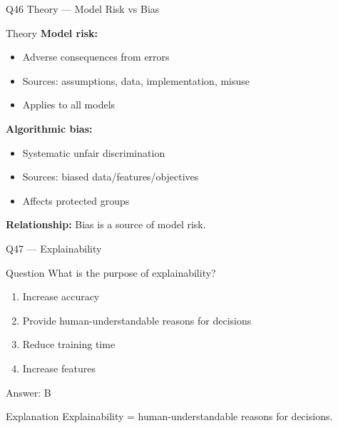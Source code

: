 \documentclass[aspectratio=169,8pt]{beamer}
\begin{document}
	\begin{frame}{Q46 Theory --- Model Risk vs Bias}
		\begin{block}{Theory}
			\textbf{Model risk:}
			\begin{itemize}
				\item Adverse consequences from errors
				\item Sources: assumptions, data, implementation, misuse
				\item Applies to all models
			\end{itemize}
			\textbf{Algorithmic bias:}
			\begin{itemize}
				\item Systematic unfair discrimination
				\item Sources: biased data/features/objectives
				\item Affects protected groups
			\end{itemize}
			\textbf{Relationship:} Bias is a source of model risk.
		\end{block}
	\end{frame}
	
	\begin{frame}{Q47 --- Explainability}
		\begin{block}{Question}
			What is the purpose of explainability?
		\end{block}
		\begin{enumerate}[label=\Alph*.]
			\item Increase accuracy
			\item Provide human-understandable reasons for decisions
			\item Reduce training time
			\item Increase features
		\end{enumerate}
		\begin{exampleblock}{Answer: B}
		\end{exampleblock}
		\begin{block}{Explanation}
			Explainability = human-understandable reasons for decisions.
		\end{block}
	\end{frame}
	
\end{document}
